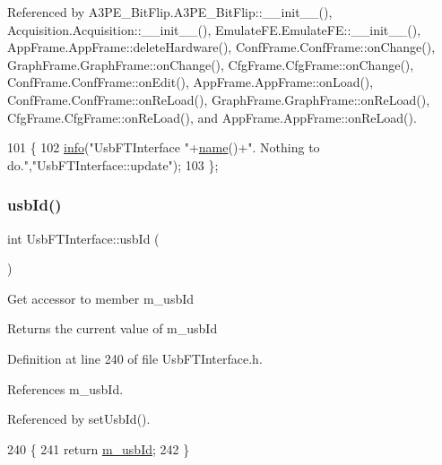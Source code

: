 Referenced by A3\+P\+E\+\_\+\+Bit\+Flip.\+A3\+P\+E\+\_\+\+Bit\+Flip\+::\+\_\+\+\_\+init\+\_\+\+\_\+(), Acquisition.\+Acquisition\+::\+\_\+\+\_\+init\+\_\+\+\_\+(), Emulate\+F\+E.\+Emulate\+F\+E\+::\+\_\+\+\_\+init\+\_\+\+\_\+(), App\+Frame.\+App\+Frame\+::delete\+Hardware(), Conf\+Frame.\+Conf\+Frame\+::on\+Change(), Graph\+Frame.\+Graph\+Frame\+::on\+Change(), Cfg\+Frame.\+Cfg\+Frame\+::on\+Change(), Conf\+Frame.\+Conf\+Frame\+::on\+Edit(), App\+Frame.\+App\+Frame\+::on\+Load(), Conf\+Frame.\+Conf\+Frame\+::on\+Re\+Load(), Graph\+Frame.\+Graph\+Frame\+::on\+Re\+Load(), Cfg\+Frame.\+Cfg\+Frame\+::on\+Re\+Load(), and App\+Frame.\+App\+Frame\+::on\+Re\+Load().


\begin{DoxyCode}
101                          \{
102     \hyperlink{classObject_a644fd329ea4cb85f54fa6846484b84a8}{info}(\textcolor{stringliteral}{"UsbFTInterface "}+\hyperlink{classObject_a300f4c05dd468c7bb8b3c968868443c1}{name}()+\textcolor{stringliteral}{". Nothing to do."},\textcolor{stringliteral}{"UsbFTInterface::update"});
103   \};
\end{DoxyCode}
\mbox{\label{classUsbFTInterface_a2a63b462eb5831b4aef9d0f4c8d6ee1a}} 
\subsubsection{\texorpdfstring{usb\+Id()}{usbId()}}
{\footnotesize\ttfamily int Usb\+F\+T\+Interface\+::usb\+Id (\begin{DoxyParamCaption}{ }\end{DoxyParamCaption})\hspace{0.3cm}{\ttfamily [inline]}}

Get accessor to member m\+\_\+usb\+Id \begin{DoxyReturn}{Returns}
the current value of m\+\_\+usb\+Id 
\end{DoxyReturn}


Definition at line 240 of file Usb\+F\+T\+Interface.\+h.



References m\+\_\+usb\+Id.



Referenced by set\+Usb\+Id().


\begin{DoxyCode}
240                \{
241     \textcolor{keywordflow}{return} \hyperlink{classUsbFTInterface_a91df5c0547e8be460bc087e27afe05aa}{m\_usbId};
242   \}
\end{DoxyCode}
\mbox{\label{classUsbFTInterface_adb38dfafa3946dd373585e596851b6e6}} 
